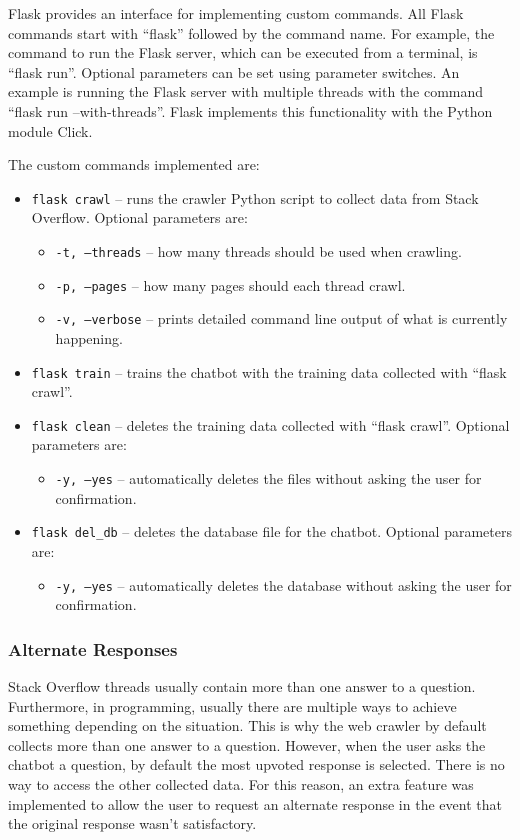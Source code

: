 \documentclass[12pt,a4paper]{article}
\begin{document}
Flask provides an interface for implementing custom commands. All Flask commands start with “flask” followed by the command name. For example, the command to run the Flask server, which can be executed from a terminal, is “flask run”. Optional parameters can be set using parameter switches. An example is running the Flask server with multiple threads with the command “flask run --with-threads”. Flask implements this functionality with the Python module Click.

The custom commands implemented are:
\begin{itemize}
    \item \texttt{flask crawl} – runs the crawler Python script to collect data from Stack Overflow. Optional parameters are:
    \begin{itemize}
        \item \texttt{-t, --threads} – how many threads should be used when crawling.
        \item \texttt{-p, --pages} – how many pages should each thread crawl.
        \item \texttt{-v, --verbose} – prints detailed command line output of what is currently happening.
    \end{itemize}
    \item \texttt{flask train} – trains the chatbot with the training data collected with “flask crawl”.
    \item \texttt{flask clean} – deletes the training data collected with “flask crawl”. Optional parameters are:
    \begin{itemize}
        \item \texttt{-y, --yes} – automatically deletes the files without asking the user for confirmation.
    \end{itemize}
    \item \texttt{flask del\_db} – deletes the database file for the chatbot. Optional parameters are:
    \begin{itemize}
        \item \texttt{-y, --yes} – automatically deletes the database without asking the user for confirmation.
    \end{itemize}        
\end{itemize}


\subsubsection{Alternate Responses}
Stack Overflow threads usually contain more than one answer to a question. Furthermore, in programming, usually there are multiple ways to achieve something depending on the situation. This is why the web crawler by default collects more than one answer to a question. However, when the user asks the chatbot a question, by default the most upvoted response is selected. There is no way to access the other collected data. For this reason, an extra feature was implemented to allow the user to request an alternate response in the event that the original response wasn’t satisfactory.
\end{document}
